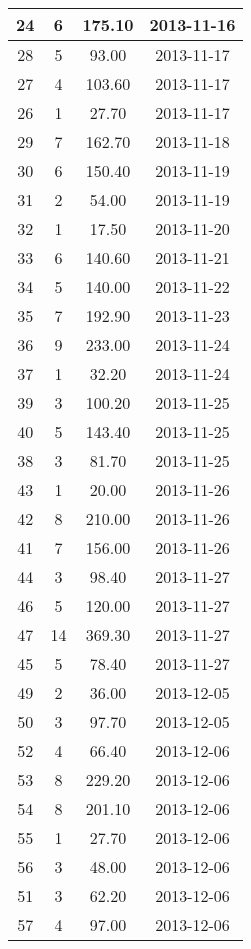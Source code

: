 \documentclass[a4paper,11pt]{article}
\begin{document}
\begin{longtable}{|c|c|c|c|}
	 24 &   6 & 175.10 & 2013-11-16\\ \hline
	 28 &   5 &  93.00 & 2013-11-17\\ \hline
	 27 &   4 & 103.60 & 2013-11-17\\ \hline
	 26 &   1 &  27.70 & 2013-11-17\\ \hline
	 29 &   7 & 162.70 & 2013-11-18\\ \hline
	 30 &   6 & 150.40 & 2013-11-19\\ \hline
	 31 &   2 &  54.00 & 2013-11-19\\ \hline
	 32 &   1 &  17.50 & 2013-11-20\\ \hline
	 33 &   6 & 140.60 & 2013-11-21\\ \hline
	 34 &   5 & 140.00 & 2013-11-22\\ \hline
	 35 &   7 & 192.90 & 2013-11-23\\ \hline
	 36 &   9 & 233.00 & 2013-11-24\\ \hline
	 37 &   1 &  32.20 & 2013-11-24\\ \hline
	 39 &   3 & 100.20 & 2013-11-25\\ \hline
	 40 &   5 & 143.40 & 2013-11-25\\ \hline
	 38 &   3 &  81.70 & 2013-11-25\\ \hline
	 43 &   1 &  20.00 & 2013-11-26\\ \hline
	 42 &   8 & 210.00 & 2013-11-26\\ \hline
	 41 &   7 & 156.00 & 2013-11-26\\ \hline
	 44 &   3 &  98.40 & 2013-11-27\\ \hline
	 46 &   5 & 120.00 & 2013-11-27\\ \hline
	 47 &  14 & 369.30 & 2013-11-27\\ \hline
	 45 &   5 &  78.40 & 2013-11-27\\ \hline
	 49 &   2 &  36.00 & 2013-12-05\\ \hline
	 50 &   3 &  97.70 & 2013-12-05\\ \hline
	 52 &   4 &  66.40 & 2013-12-06\\ \hline
	 53 &   8 & 229.20 & 2013-12-06\\ \hline
	 54 &   8 & 201.10 & 2013-12-06\\ \hline
	 55 &   1 &  27.70 & 2013-12-06\\ \hline
	 56 &   3 &  48.00 & 2013-12-06\\ \hline
	 51 &   3 &  62.20 & 2013-12-06\\ \hline
	 57 &   4 &  97.00 & 2013-12-06\\ \hline

\end{longtable}
\end{document}
